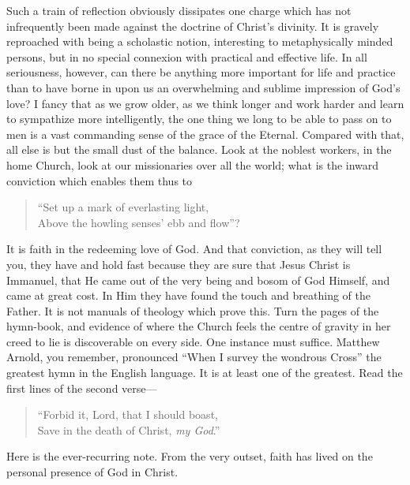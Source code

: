\documentclass[12pt,a5paper,oneside]{book}
\begin{document}
Such a train of reflection obviously dissipates 
one charge which has not infrequently been made
against the doctrine of Christ's divinity. It is
gravely reproached with being a scholastic notion,
interesting to metaphysically minded persons,
but in no special connexion with practical
and effective life. In all seriousness, however,
can there be anything more important for
life and practice than to have borne in
upon us an overwhelming and sublime impression 
of God's love? I fancy that as we grow
older, as we think longer and work harder
and learn to sympathize more intelligently,
the one thing we long to be able to pass on to
men is a vast commanding sense of the grace
of the Eternal. Compared with that, all else
is but the small dust of the balance. Look
at the noblest workers, in the home Church,
look at our missionaries over all the world;
what is the inward conviction which enables
them thus to
\begin{verse}
\small
``Set up a mark of everlasting light,\\
Above the howling senses' ebb and flow''?
\end{verse}
It is faith in the redeeming love of God. And
that conviction, as they will tell you, they
have and hold fast because they are sure that
Jesus Christ is Immanuel, that He came out
of the very being and bosom of God Himself,
and came at great cost. In Him they have
found the touch and breathing of the Father.
It is not manuals of theology which prove this.
Turn the pages of the hymn-book, and evidence
of where the Church feels the centre of gravity
in her creed to lie is discoverable on every side.
One instance must suffice. Matthew Arnold, you
remember, pronounced ``When I survey the
wondrous Cross'' the greatest hymn in the
English language. It is at least one of the
greatest. Read the first lines of the second
verse---
\begin{verse}
``Forbid it, Lord, that I should boast,\\
Save in the death of Christ, \textit{my God}.''
\end{verse}
Here is the ever-recurring note. From the
very outset, faith has lived on the personal
presence of God in Christ.
\end{document}
